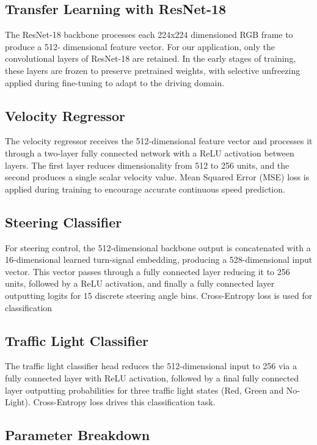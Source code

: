 \documentclass{article} %
\begin{document}
\subsection{Transfer Learning with ResNet-18}

The ResNet-18 backbone processes each 224x224 dimensioned RGB frame to produce a 512- dimensional feature vector. 
For our application, only the convolutional layers of ResNet-18 are retained. In the early stages of training, these layers are frozen to preserve pretrained weights, with selective unfreezing applied during fine-tuning to adapt to the driving domain.

\subsection{Velocity Regressor}
The velocity regressor receives the 512-dimensional feature vector and processes it through a two-layer fully connected network with a ReLU activation between layers. 
The first layer reduces dimensionality from 512 to 256 units, and the second produces a single scalar velocity value. Mean Squared Error (MSE) 
loss is applied during training to encourage accurate continuous speed prediction.

\subsection{Steering Classifier}
For steering control, the 512-dimensional backbone output is concatenated with a 16-dimensional learned turn-signal embedding, producing a 528-dimensional input vector. 
This vector passes through a fully connected layer reducing it to 256 units, followed by a ReLU activation, and finally a fully connected layer outputting logits for 15 discrete steering angle bins. 
Cross-Entropy loss is used for classification

\subsection{Traffic Light Classifier}

The traffic light classifier head reduces the 512-dimensional input to 256 via a fully connected layer with ReLU activation, followed by a final fully connected layer outputting probabilities for three traffic light states (Red, Green and No-Light). 
Cross-Entropy loss drives this classification task.

\subsection{Parameter Breakdown}
\end{document}
